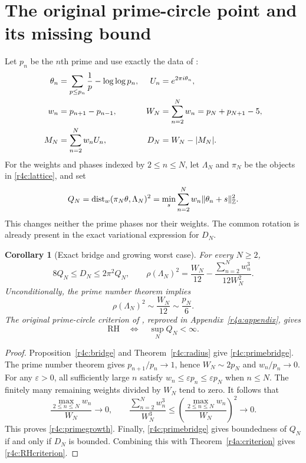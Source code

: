\documentclass[11pt,a4paper]{article}
\newtheorem{corollary}[theorem]{Corollary}
\theoremstyle{definition}\newtheorem{definition}[theorem]{Definition}
\theoremstyle{remark}\newtheorem{remark}[theorem]{Remark}
\numberwithin{equation}{section}
\begin{document}
\section{The original prime-circle point and its missing bound}
\label{r4c:prime}

Let $p_n$ be the $n$th prime and use exactly the data of
\cite{PrimeCircles}:
\begin{align}
 \theta_n&=\sum_{p\leq p_n}\frac1p-\log\log p_n,
 & U_n&=e^{2\pi i\theta_n},\notag\\
 w_n&=p_{n+1}-p_{n-1},
 & W_N&=\sum_{n=2}^Nw_n=p_N+p_{N+1}-5,\label{r4c:primedata}\\
 M_N&=\sum_{n=2}^Nw_nU_n,
 & D_N&=W_N-|M_N|.\notag
\end{align}
For the weights and phases indexed by $2\leq n\leq N$, let
$\Lambda_N$ and $\pi_N$ be the objects in \eqref{r4c:lattice}, and set
\begin{equation}\label{r4c:primeQ}
 Q_N=\operatorname{dist}_{w}(\pi_N\theta,\Lambda_N)^2
    =\min_s\sum_{n=2}^Nw_n\|\theta_n+s\|_{\mathbb Z}^2.
\end{equation}
This changes neither the prime phases nor their weights.  The common
rotation is already present in the exact variational expression for
$D_N$.

\begin{corollary}[Exact bridge and growing worst case]
\label{r4c:primecorollary}
For every $N\geq2$,
\begin{equation}\label{r4c:primebridge}
 8Q_N\leq D_N\leq2\pi^2Q_N,
 \qquad
 \rho(\Lambda_N)^2
   =\frac{W_N}{12}
       -\frac{\sum_{n=2}^Nw_n^3}{12W_N^2}.
\end{equation}
Unconditionally, the prime number theorem implies
\begin{equation}\label{r4c:primegrowth}
 \rho(\Lambda_N)^2\sim\frac{W_N}{12}\sim\frac{p_N}{6}.
\end{equation}
The original prime-circle criterion of \cite{PrimeCircles},
reproved in Appendix~\ref{r4a:appendix}, gives
\begin{equation}\label{r4c:RHcriterion}
 \mathrm{RH}\quad\Longleftrightarrow\quad
 \sup_N Q_N<\infty.
\end{equation}
\end{corollary}

\begin{proof}
Proposition~\ref{r4c:bridge} and Theorem~\ref{r4c:radius} give
\eqref{r4c:primebridge}.  The prime number theorem gives
$p_{n+1}/p_n\to1$, hence $W_N\sim2p_N$ and $w_n/p_n\to0$.
For any $\varepsilon>0$, all sufficiently large $n$ satisfy
$w_n\leq\varepsilon p_n\leq\varepsilon p_N$ when $n\leq N$.
The finitely many remaining weights divided by $W_N$ tend to zero.
It follows that
\[
 \frac{\max_{2\leq n\leq N}w_n}{W_N}\longrightarrow0,
 \qquad
 \frac{\sum_{n=2}^Nw_n^3}{W_N^3}
 \leq\left(\frac{\max_{2\leq n\leq N}w_n}{W_N}\right)^2
 \longrightarrow0.
\]
This proves \eqref{r4c:primegrowth}.  Finally,
\eqref{r4c:primebridge} gives boundedness of $Q_N$ if and only if
$D_N$ is bounded.  Combining this with Theorem~\ref{r4a:criterion} gives \eqref{r4c:RHcriterion}.
\end{proof}
\end{document}
